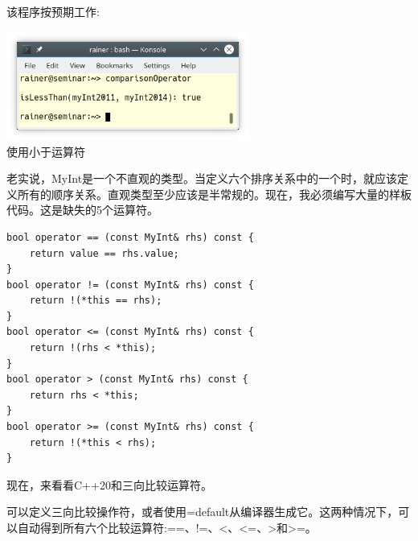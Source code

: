 该程序按预期工作:

\begin{center}
\includegraphics[width=0.6\textwidth]{content/3/chapter4/images/27.png}\\
使用小于运算符
\end{center}

老实说，MyInt是一个不直观的类型。当定义六个排序关系中的一个时，就应该定义所有的顺序关系。直观类型至少应该是半常规的。现在，我必须编写大量的样板代码。这是缺失的5个运算符。

\begin{lstlisting}[style=styleCXX]
bool operator == (const MyInt& rhs) const {
	return value == rhs.value;
}
bool operator != (const MyInt& rhs) const {
	return !(*this == rhs);
}
bool operator <= (const MyInt& rhs) const {
	return !(rhs < *this);
}
bool operator > (const MyInt& rhs) const {
	return rhs < *this;
}
bool operator >= (const MyInt& rhs) const {
	return !(*this < rhs);
}
\end{lstlisting}

现在，来看看C++20和三向比较运算符。


可以定义三向比较操作符，或者使用=default从编译器生成它。这两种情况下，可以自动得到所有六个比较运算符:==、!=、<、<=、>和>=。

